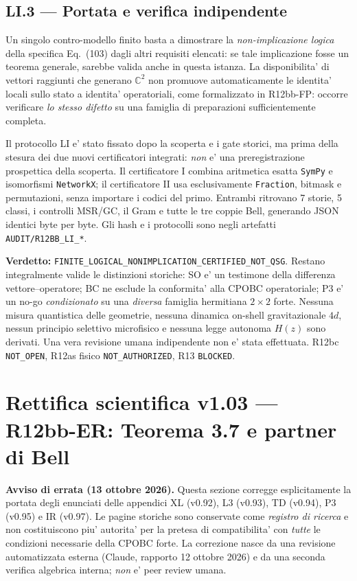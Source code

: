 \documentclass[11pt,a4paper]{article}
\begin{document}
\subsection*{LI.3 --- Portata e verifica indipendente}
Un singolo contro-modello finito basta a dimostrare la \emph{non-implicazione logica} della specifica Eq.~(103) dagli altri requisiti elencati: se tale implicazione fosse un teorema generale, sarebbe valida anche in questa istanza. La disponibilita' di vettori raggiunti che generano $\mathbb C^2$ non promuove automaticamente le identita' locali sullo stato a identita' operatoriali, come formalizzato in R12bb-FP: occorre verificare \emph{lo stesso difetto} su una famiglia di preparazioni sufficientemente completa.

Il protocollo LI e' stato fissato dopo la scoperta e i gate storici, ma prima della stesura dei due nuovi certificatori integrati: \emph{non} e' una preregistrazione prospettica della scoperta. Il certificatore I combina aritmetica esatta \texttt{SymPy} e isomorfismi \texttt{NetworkX}; il certificatore II usa esclusivamente \texttt{Fraction}, bitmask e permutazioni, senza importare i codici del primo. Entrambi ritrovano 7 storie, 5 classi, i controlli MSR/GC, il Gram e tutte le tre coppie Bell, generando JSON identici byte per byte. Gli hash e i protocolli sono negli artefatti \texttt{AUDIT/R12BB\_LI\_*}.

\textbf{Verdetto:} \texttt{FINITE\_LOGICAL\_NONIMPLICATION\_CERTIFIED\_NOT\_QSG}. Restano integralmente valide le distinzioni storiche: SO e' un testimone della differenza vettore--operatore; BC ne esclude la conformita' alla CPOBC operatoriale; P3 e' un no-go \emph{condizionato} su una \emph{diversa} famiglia hermitiana $2\times2$ forte. Nessuna misura quantistica delle geometrie, nessuna dinamica on-shell gravitazionale $4d$, nessun principio selettivo microfisico e nessuna legge autonoma $H(z)$ sono derivati. Una vera revisione umana indipendente non e' stata effettuata. R12bc \texttt{NOT\_OPEN}, R12as fisico \texttt{NOT\_AUTHORIZED}, R13 \texttt{BLOCKED}.
\endgroup


\clearpage
\begingroup
\setlength{\parskip}{0.18em}
\section*{Rettifica scientifica v1.03 --- R12bb-ER: Teorema 3.7 e partner di Bell}
\textbf{Avviso di errata (13 ottobre 2026).} Questa sezione corregge esplicitamente
la portata degli enunciati delle appendici XL (v0.92), L3 (v0.93), TD (v0.94),
P3 (v0.95) e IR (v0.97). Le pagine storiche sono conservate come \emph{registro di ricerca}
e non costituiscono piu' autorita' per la pretesa di compatibilita' con \emph{tutte}
le condizioni necessarie della CPOBC forte. La correzione nasce da una revisione
automatizzata esterna (Claude, rapporto 12 ottobre 2026) e da una seconda
verifica algebrica interna; \emph{non} e' peer review umana.
\end{document}
